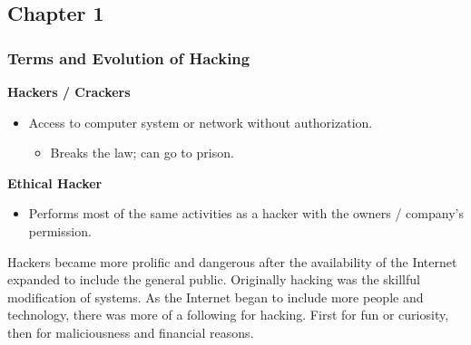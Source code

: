 \subsection{Chapter 1}
\subsubsection{Terms and Evolution of Hacking}
\textbf{Hackers / Crackers}
\begin{itemize}
    \item Access to computer system or network without authorization.
    \begin{itemize}
        \item Breaks the law; can go to prison.
    \end{itemize}
\end{itemize}

\textbf{Ethical Hacker}
\begin{itemize}
    \item Performs most of the same activities as a hacker with the owners / company's permission.
\end{itemize}

Hackers became more prolific and dangerous after the availability of the Internet expanded to include the general public.
Originally hacking was the skillful modification of systems.
As the Internet began to include more people and technology, there was more of a following for hacking.
First for fun or curiosity, then for maliciousness and financial reasons.

